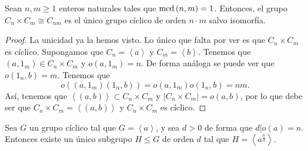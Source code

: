 \begin{colorary}
Sean $\displaystyle n,m \geq 1 $ enteros naturales tales que $\displaystyle \text{mcd}\left(n,m\right) = 1 $. Entonces, el grupo $\displaystyle C_{n} \times C_{m} \cong C_{nm} $ es el único grupo cíclico de orden $\displaystyle n \cdot m $ salvo isomorfía.
\end{colorary}
\begin{proof}
La unicidad ya la hemos visto. Lo único que falta por ver es que $\displaystyle C_{n}\times C_{m} $ es cíclico. Supongamos que $\displaystyle C_{n} = \left\langle a \right\rangle  $ y $\displaystyle C_{m} = \left\langle b \right\rangle  $. Tenemos que $\displaystyle \left(a, 1_{m}\right) \in C_{n} \times C_{m} $ y $\displaystyle o\left(a,1_{m}\right) = n $.
De forma análoga se puede ver que $\displaystyle o\left(1_{n}, b\right) = m $. Tenemos que 
\[o\left(\left(a, 1_{m}\right)\left(1_{n}, b\right)\right) = o\left(a,1_{m}\right)o\left(1_{n},b\right) = nm .\]
Así, tenemos que $\displaystyle \left\langle \left(a,b\right) \right\rangle \subset C_{n} \times C_{m} $ y $\displaystyle \left|C_{n} \times C_{m}\right| = o\left(a,b\right) $, por lo que debe ser que $\displaystyle C_{n}\times C_{m} = \left\langle \left(a,b\right) \right\rangle  $ y $\displaystyle C_{n} \times C_{m} $ es cíclico.
\end{proof}
\begin{prop}
Sea $\displaystyle G $ un grupo cíclico tal que $\displaystyle G = \left\langle a \right\rangle  $, y sea $\displaystyle d > 0 $ de forma que $\displaystyle d | o\left(a\right) = n $. Entonces existe un único subgrupo $\displaystyle H \leq G $ de orden $\displaystyle d $ tal que $\displaystyle H = \left\langle a^{\frac{n}{d}} \right\rangle  $.
\end{prop}

